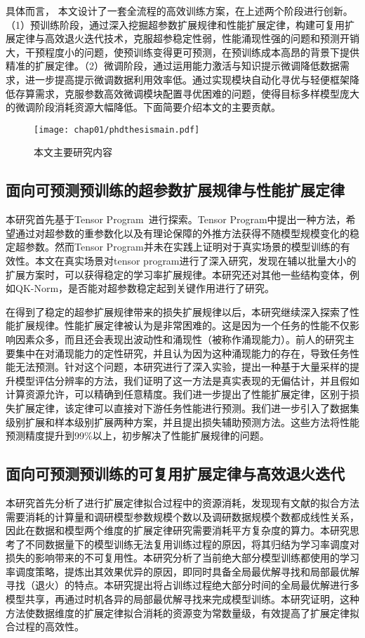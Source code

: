 具体而言， 本文设计了一套全流程的高效训练方案，在上述两个阶段进行创新。（1）预训练阶段，通过深入挖掘超参数扩展规律和性能扩展定律，构建可复用扩展定律与高效退火迭代技术，克服超参稳定性弱，性能涌现性强的问题和预测开销大，干预程度小的问题，使预训练变得更可预测，在预训练成本高昂的背景下提供精准的扩展定律。（2）微调阶段，通过运用能力激活与知识提示微调降低数据需求，进一步提高提示微调数据利用效率低。通过实现模块自动化寻优与轻便框架降低存算需求，克服参数高效微调模块配置寻优困难的问题，使得目标多样模型庞大的微调阶段消耗资源大幅降低。下面简要介绍本文的主要贡献。

\begin{figure}
  \centering
  \texttt{[image: chap01/phdthesismain.pdf]}
  \label{fig:mainframework}
  \caption{本文主要研究内容}
  \end{figure}

  
\subsection{面向可预测预训练的超参数扩展规律与性能扩展定律}
本研究首先基于Tensor Program~\cite{yang2022tensor}进行探索。Tensor Program中提出一种方法，希望通过对超参数的重参数化以及有理论保障的外推方法获得不随模型规模变化的稳定超参数。然而Tensor Program并未在实践上证明对于真实场景的模型训练的有效性。本文在真实场景对tensor program进行了深入研究，发现在辅以批量大小的扩展方案时，可以获得稳定的学习率扩展规律。本研究还对其他一些结构变体，例如QK-Norm，是否能对超参数稳定起到关键作用进行了研究。

在得到了稳定的超参扩展规律带来的损失扩展规律以后，本研究继续深入探索了性能扩展规律。性能扩展定律被认为是非常困难的。这是因为一个任务的性能不仅影响因素众多，而且还会表现出波动性和涌现性（被称作涌现能力）。前人的研究主要集中在对涌现能力的定性研究，并且认为因为这种涌现能力的存在，导致任务性能无法预测。针对这个问题，本研究进行了深入实验，提出一种基于大量采样的提升模型评估分辨率的方法，我们证明了这一方法是真实表现的无偏估计，并且假如计算资源允许，可以精确到任意精度。我们进一步提出了性能扩展定律，区别于损失扩展定律，该定律可以直接对下游任务性能进行预测。我们进一步引入了数据集级别扩展和样本级别扩展两种方案，并且提出损失辅助预测方法。这些方法将性能预测精度提升到99\%以上，初步解决了性能扩展规律的问题。

\subsection{面向可预测预训练的可复用扩展定律与高效退火迭代}
本研究首先分析了进行扩展定律拟合过程中的资源消耗，发现现有文献的拟合方法需要消耗的计算量和调研模型参数规模个数以及调研数据规模个数都成线性关系，因此在数据和模型两个维度的扩展定律研究需要消耗平方复杂度的算力。本研究思考了不同数据量下的模型训练无法复用训练过程的原因，将其归结为学习率调度对损失的影响带来的不可复用性。本研究分析了当前绝大部分模型训练都使用的学习率调度策略，提炼出其效果优异的原因，即同时具备全局最优解寻找和局部最优解寻找（退火）的特点。本研究提出将占训练过程绝大部分时间的全局最优解进行多模型共享，再通过时机各异的局部最优解寻找来完成模型训练。本研究证明，这种方法使数据维度的扩展定律拟合消耗的资源变为常数量级，有效提高了扩展定律拟合过程的高效性。

